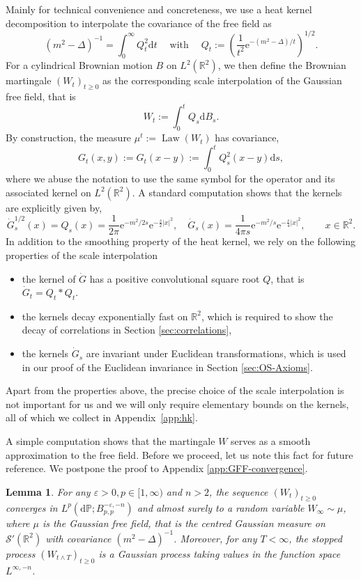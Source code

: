 \documentclass[11pt, a4paper]{scrartcl}
\numberwithin{equation}{section}
\theoremstyle{plain}
\newtheorem{lemma}[foo]{Lemma}
\theoremstyle{remark}
\newcommand{\assign}{:=}
\newcommand{\mathd}{\mathrm{d}}
\newcommand{\mathe}{\mathrm{e}}
\newcommand{\tmop}[1]{\ensuremath{\operatorname{#1}}}
\begin{document}
Mainly for technical convenience and concreteness, we use a heat kernel
decomposition to interpolate the covariance of the free field as
\[ (m^2 - \Delta)^{- 1} = \int_0^{\infty} Q_t^2 \mathd t \quad \tmop{with}
   \quad Q_t \assign \left( \frac{1}{t^2} \mathe^{- (m^2 - \Delta) / t}
   \right)^{1 / 2} . \]
For a cylindrical Brownian motion $B$ on $L^2 (\mathbb{R}^2)$, we then define
the Brownian martingale $(W_t)_{t \geqslant 0}$ as the corresponding scale
interpolation of the Gaussian free field, that is
\[ W_t \assign \int_0^t Q_s \mathd B_s . \]
By construction, the measure $\mu^t \assign \tmop{Law} (W_t)$ has covariance,
\begin{equation}
  G_t (x, y) \assign G_t (x - y) \assign \int_0^t Q^2_s (x - y) \mathd s,
  \label{eq:def-G}
\end{equation}
where we abuse the notation to use the same symbol for the operator and its
associated kernel on $L^2 (\mathbb{R}^2)$. A standard computation shows that
the kernels are explicitly given by,
\begin{equation}
  \dot{G}_s^{1 / 2} (x) = Q_s (x) = \frac{1}{2 \pi} \mathe^{- m^2 / 2 s}
  \mathe^{- \frac{s}{2} | x |^2}, \quad \dot{G}_s (x) = \frac{1}{4 \pi s} \mathe^{-
  m^2 / s} \mathe^{- \frac{s}{4} | x |^2} \label{eq:G-kernel}, \qquad x \in
  \mathbb{R}^2 .
\end{equation}
In addition to the smoothing property of the heat kernel, we rely on the following properties of the scale interpolation 
\begin{itemize}
  \item the kernel of $\dot{G}$ has a positive convolutional
square root $Q$, that is $\dot{G}_t = Q_t \ast Q_t$. 
  \item the kernels decay exponentially fast on $\mathbb R^2$, which is required to show the decay of correlations in Section
  \ref{sec:correlations},
  \item the kernels $\dot{G}_s$ are invariant under Euclidean transformations, which is used in our proof of the Euclidean invariance in Section \ref{sec:OS-Axioms}.
\end{itemize}
Apart from the properties above, the precise choice of the scale
interpolation is not important for us and we will only require elementary
bounds on the kernels, all of which we collect in Appendix~\ref{app:hk}.

A simple computation shows that the martingale $W$ serves as a smooth
approximation to the free field. Before we proceed, let us note this fact for
future reference. We postpone the proof to Appendix \ref{app:GFF-convergence}.
\begin{lemma}
  \label{lem:GFF-convergence}For any $\varepsilon > 0, p \in [1, \infty)$ and
  $n > 2$, the sequence $(W_t)_{t \geqslant 0}$ converges in $L^p (\mathd \mathbb{P} ;
  B_{p, p}^{- \varepsilon, - n})$ and almost surely to a random variable
  $W_{\infty} \sim \mu$, where $\mu$ is the Gaussian free field, that is the
  centred Gaussian measure on $\mathcal{S}' (\mathbb{R}^2)$ with covariance
  $(m^2 - \Delta)^{- 1}$. Moreover, for any $T < \infty$, the stopped process
  $(W_{t \wedge T})_{t \geqslant 0}$ is a Gaussian process taking values in
  the function space $L^{\infty, - n}$.
\end{lemma}
\end{document}
